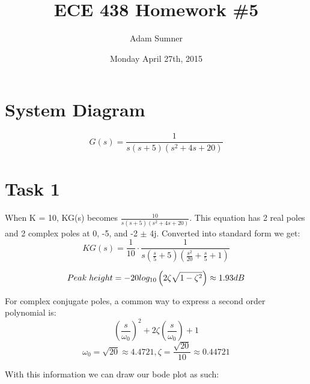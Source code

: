 \documentclass[12pt,letter]{article}
\title{\textbf{ECE 438 Homework \#5}}
\author{Adam Sumner}
\date{Monday April 27th, 2015}
\begin{document}
\maketitle
\section*{System Diagram}
\begin{figure}[H]
\centering
{}
\end{figure}

$$G(s)= \frac{1}{s(s+5)(s^2+4s+20)}$$

\section*{Task 1}
When K = 10, KG(s) becomes $\frac{10}{s(s+5)(s^2+4s+20)}$. This equation has 2 real poles and 2 complex poles at 0, -5, and -2 $\pm$ 4j. Converted into standard form we get:
$$KG(s) = \frac{1}{10} \cdot \frac{1}{s(\frac{s}{5}+5)(\frac{s^2}{20}+\frac{s}{5}+1)}$$

$$Peak\hspace{.1cm}height = -20log_{10}\left(2\zeta\sqrt{1-\zeta^2}\right) \approx 1.93dB$$

\noindent For complex conjugate poles, a common way to express a second order polynomial is:
$$\left( \frac{s}{\omega_0}\right)^2+2\zeta\left(\frac{s}{\omega_0}\right)+1$$
$$\omega_0=\sqrt{20} \approx 4.4721, \zeta = \frac{\sqrt{20}}{10} \approx 0.44721$$

\noindent With this information we can draw our bode plot as such:
\end{document}
